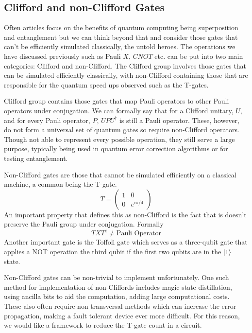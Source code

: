\documentclass[12pt]{article}
\newcommand{\newp}
    {
    \vskip 0.5cm 
  }
\numberwithin{equation}{section}
\begin{document}
\subsection{Clifford and non-Clifford Gates}
Often articles focus on the benefits of quantum computing being superposition 
and entanglement but we can think beyond that and consider those gates that can't
be efficiently simulated classically, the untold heroes. 
The operations we have discussed previously such as Pauli $X$, $CNOT$ etc. can be put 
into two main categories: Clifford and non-Clifford. The Clifford group involves 
those gates that can be simulated efficiently classically, with non-Clifford 
containing those that are responsible for the quantum speed ups observed such as 
the T-gates. 
\newp 
Clifford group contains those gates that map Pauli operators to other Pauli 
operators under conjugation. We can formally say that for a Clifford unitary, $U$, 
and for every Pauli operator, $P$, $UPU^{\dagger}$ is still a Pauli operator. 
These, however, do not form a universal set of quantum gates so require 
non-Clifford operators. Though not able to represent every possible operation,
they still serve a large purpose, typically being used in quantum error correction 
algorithms or for testing entanglement. 
\newp 
Non-Clifford gates are those that cannot be simulated efficiently on a classical 
machine, a common being the T-gate. 
\begin{equation}
  T = 
  \begin{pmatrix} 
1 & 0 \\ 
0 & e^{i\pi/4} 
\end{pmatrix} 
\end{equation}
An important property that defines this as non-Clifford is the fact that is doesn't 
preserve the Pauli group under conjugation. Formally 
\begin{equation}
  TXT^{\dagger} \neq \text{Pauli Operator}
\end{equation}
Another important gate is the Toffoli gate which serves as a three-qubit gate 
that applies a NOT operation the third qubit if the first two qubits are in the 
$|1\rangle$ state.
\newp 
Non-Clifford gates can be non-trivial to implement unfortunately. 
One such method for implementation of non-Cliffords includes magic state 
distillation, using ancilla bits to aid the computation, adding large computational 
costs. These also often require non-transversal methods which can increase the 
error propagation, making a fault tolerant device ever more difficult. For this 
reason, we would like a framework to reduce the T-gate count in a circuit.
\end{document}
